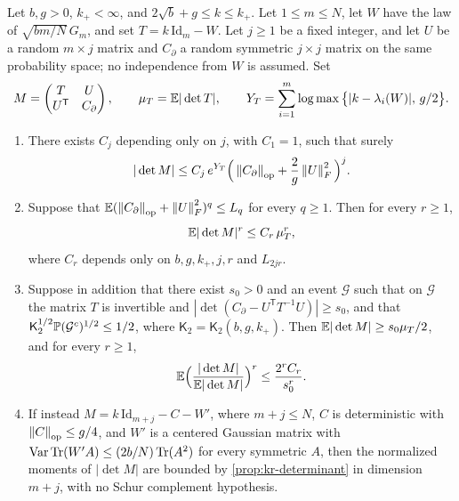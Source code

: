 \begin{lemma}\label{lem:kr-border}
Let $b,g>0$, $k_+<\infty$, and $2\sqrt b+g\le k\le k_+$. Let $1\le m\le N$, let $W$ have the law of $\sqrt{bm/N}\,G_m$, and set $T=k\,\mathrm{Id}_m-W$. Let $j\ge1$ be a fixed integer, and let $U$ be a random $m\times j$ matrix and $C_\partial$ a random symmetric $j\times j$ matrix on the same probability space; no independence from $W$ is assumed. Set
\[
M=\begin{pmatrix}T&U\\U^{\mathsf T}&C_\partial\end{pmatrix},\qquad \mu_T=\mathbb E|\det T|,\qquad Y_T=\sum_{i=1}^m\log\max\big\{|k-\lambda_i(W)|,\,g/2\big\}.
\]
\begin{enumerate}
\item There exists $C_j$ depending only on $j$, with $C_1=1$, such that surely
\begin{equation}\label{eq:kr-cofactor}
|\det M|\le C_j\,e^{Y_T}\Big(\left\lVert C_\partial\right\rVert_{\rm op}+\frac2g\left\lVert U\right\rVert_F^2\Big)^j.
\end{equation}
\item Suppose that $\mathbb E(\left\lVert C_\partial\right\rVert_{\rm op}+\left\lVert U\right\rVert_F^2)^q\le L_q$ for every $q\ge1$. Then for every $r\ge1$,
\begin{equation}\label{eq:kr-border-upper}
\mathbb E|\det M|^r\le C_r\,\mu_T^r,
\end{equation}
where $C_r$ depends only on $b,g,k_+,j,r$ and $L_{2jr}$.
\item Suppose in addition that there exist $s_0>0$ and an event $\mathcal G$ such that on $\mathcal G$ the matrix $T$ is invertible and $|\det(C_\partial-U^{\mathsf T}T^{-1}U)|\ge s_0$, and that $\mathsf K_2^{1/2}\mathbb P(\mathcal G^c)^{1/2}\le1/2$, where $\mathsf K_2=\mathsf K_2(b,g,k_+)$. Then $\mathbb E|\det M|\ge s_0\mu_T/2$, and for every $r\ge1$,
\begin{equation}\label{eq:kr-border-normalized}
\mathbb E\Big(\frac{|\det M|}{\mathbb E|\det M|}\Big)^r\le\frac{2^rC_r}{s_0^r}.
\end{equation}
\item If instead $M=k\,\mathrm{Id}_{m+j}-C-W'$, where $m+j\le N$, $C$ is deterministic with $\left\lVert C\right\rVert_{\rm op}\le g/4$, and $W'$ is a centered Gaussian matrix with $\operatorname{Var}\operatorname{Tr}(W'A)\le(2b/N)\operatorname{Tr}(A^2)$ for every symmetric $A$, then the normalized moments of $|\det M|$ are bounded by \cref{prop:kr-determinant} in dimension $m+j$, with no Schur complement hypothesis.
\end{enumerate}
\end{lemma}

